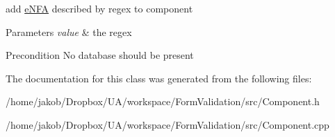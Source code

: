 add \hyperlink{classFA_1_1eNFA}{e\-N\-F\-A} described by regex to component 


\begin{DoxyParams}{Parameters}
{\em value} & the regex\\
\hline
\end{DoxyParams}
\begin{DoxyPrecond}{Precondition}
No database should be present 
\end{DoxyPrecond}


The documentation for this class was generated from the following files\-:\begin{DoxyCompactItemize}
\item 
/home/jakob/\-Dropbox/\-U\-A/workspace/\-Form\-Validation/src/Component.\-h\item 
/home/jakob/\-Dropbox/\-U\-A/workspace/\-Form\-Validation/src/Component.\-cpp\end{DoxyCompactItemize}
